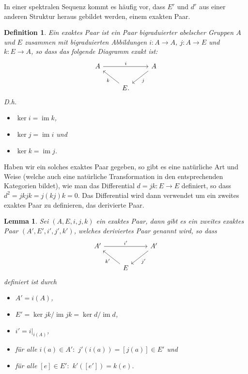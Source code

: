 \documentclass[12pt, hidelinks]{article}
\numberwithin{conj}{section}
\newtheorem{definition}[conj]{Definition}
\newtheorem{lemma}[conj]{Lemma}
\newcommand{\ima}{\operatorname{im}}
\begin{document}
In einer spektralen Sequenz kommt es häufig vor, dass $E^r$ und $d^r$ aus einer anderen Struktur heraus gebildet werden, einem exakten Paar.

\begin{definition}
    Ein exaktes Paar ist ein Paar bigraduierter abelscher Gruppen $A$ und $E$ zusammen mit bigraduierten Abbildungen $i: A \to A$, $j: A \to E$ und $k: E \to A$, so dass das folgende Diagramm exakt ist:
    \[\begin{tikzcd}
    	A && A \\
    	& E.
    	\arrow["i", from=1-1, to=1-3]
    	\arrow["j", from=1-3, to=2-2]
    	\arrow["k", from=2-2, to=1-1]
    \end{tikzcd}\]
    D.h.
    \begin{itemize}[nolistsep]
        \item $\ker i = \ima k$,
        \item $\ker j = \ima i$ und
        \item $\ker k = \ima j$.
    \end{itemize}
\end{definition}

Haben wir ein solches exaktes Paar gegeben, so gibt es eine natürliche Art und Weise (welche auch eine natürliche Transformation in den entsprechenden Kategorien bildet), wie man das Differential $d = jk: E \to E$ definiert, so dass $d^2 = jkjk = j(kj)k = 0$. Das Differential wird dann verwendet um ein zweites exaktes Paar zu definieren, das derivierte Paar.

\begin{lemma}
    Sei $(A,E,i,j,k)$ ein exaktes Paar, dann gibt es ein zweites exaktes Paar $(A',E',i',j',k')$, welches deriviertes Paar genannt wird, so dass
    \[\begin{tikzcd}
    	A' && A' \\
    	& E
    	\arrow["i'", from=1-1, to=1-3]
    	\arrow["j'", from=1-3, to=2-2]
    	\arrow["k'", from=2-2, to=1-1]
    \end{tikzcd}\]
    definiert ist durch
    \begin{itemize}[nolistsep]
        \item $A' = i(A)$,
        \item $E' = \ker jk / \ima jk = \ker d / \ima d$,
        \item $i' = i\vert_{i(A)}$,
        \item für alle $i(a) \in A':$ $j'(i(a)) = [j(a)] \in E'$ und
        \item für alle $[e] \in E':$ $k'([e']) = k(e)$.
    \end{itemize}
\end{lemma}
\end{document}
